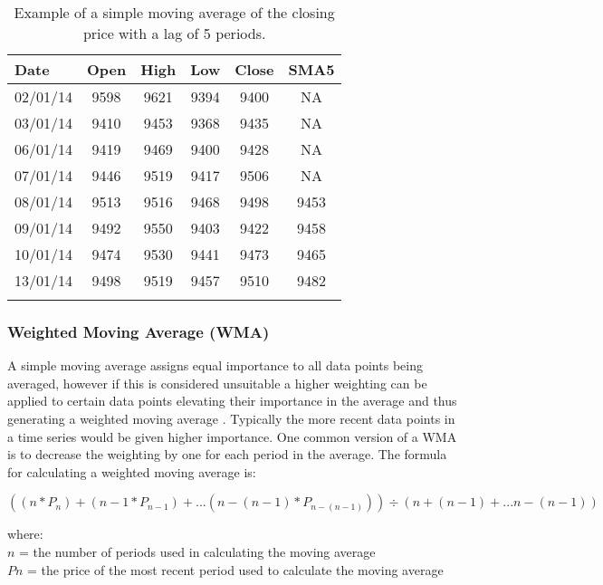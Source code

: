 \begin{table}[htbp]
  \centering
  \caption[Example of a Simple Moving Average]{Example of a simple moving average of the closing price with a lag of 5 periods.}
    \begin{tabular}{@{\extracolsep{5pt}}lccccc}
    \toprule
    \textbf{Date} & \textbf{Open} & \textbf{High} & \textbf{Low} & \textbf{Close} & \textbf{SMA5} \\
    \midrule
    02/01/14 & 9598  & 9621  & 9394  & 9400  &  NA \\
    03/01/14 & 9410  & 9453  & 9368  & 9435  &  NA \\
    06/01/14 & 9419  & 9469  & 9400  & 9428  &  NA \\
    07/01/14 & 9446  & 9519  & 9417  & 9506  &  NA \\
    08/01/14 & 9513  & 9516  & 9468  & 9498  & 9453 \\
    09/01/14 & 9492  & 9550  & 9403  & 9422  & 9458 \\
    10/01/14 & 9474  & 9530  & 9441  & 9473  & 9465 \\
    13/01/14 & 9498  & 9519  & 9457  & 9510  & 9482 \\
    \bottomrule
    \normalsize 
    \end{tabular}%
  \label{tab:SMA}%
\end{table}%

\subsubsection{Weighted Moving Average (WMA)}
A simple moving average assigns equal importance to all data points being averaged, however if this is considered unsuitable a higher weighting can be applied to certain data points elevating their importance in the average and thus generating a weighted moving average \citep{WMA2}. Typically the more recent data points in a time series would be given higher importance. One common version of a WMA is to decrease the weighting by one for each period in the average. The formula for calculating a weighted moving average is:

\[ ((n*P_{n}) + (n-1*P_{n-1})+ ... (n-(n-1)*P_{n-(n-1)})) \div (n + (n-1) + ... n-(n-1))\]

where: \\
$ n $ = the number of periods used in calculating the moving average \\
$ Pn $ = the price of the most recent period used to calculate the moving average 

